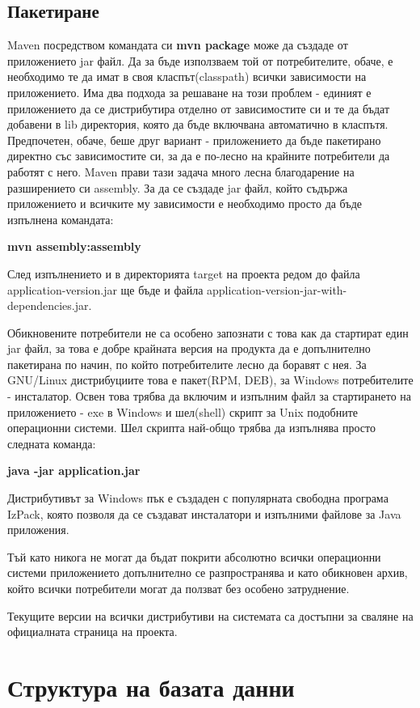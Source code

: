 \subsection{Пакетиране}

Maven посредством командата си \textbf{mvn package} може да създаде от
приложението jar файл. Да за бъде използваем той от потребителите,
обаче, е необходимо те да имат в своя класпът(classpath) всички зависимости на
приложението. Има два подхода за решаване на този проблем - единият е
приложението да се дистрибутира отделно от зависимостите си и те да
бъдат добавени в lib директория, която да бъде включвана автоматично в
класпътя. Предпочетен, обаче, беше друг вариант - приложението да бъде
пакетирано директно със зависимостите си, за да е по-лесно на крайните
потребители да работят с него. Maven прави тази задача много лесна
благодарение на разширението си assembly. За да се създаде jar файл,
който съдържа приложението и всичките му зависимости е необходимо
просто да бъде изпълнена командата:

\textbf{mvn assembly:assembly}

След изпълнението и в директорията target на проекта редом до файла
application-version.jar ще бъде и файла
application-version-jar-with-dependencies.jar.

Обикновените потребители не са особено запознати с това как да
стартират един jar файл, за това е добре крайната версия на продукта
да е допълнително пакетирана по начин, по който потребителите лесно да
боравят с нея. За GNU/Linux дистрибуциите това е пакет(RPM, DEB), за
Windows потребителите - инсталатор. Освен това трябва да включим и
изпълним файл за стартирането на приложението - exe в Windows и шел(shell)
скрипт за Unix подобните операционни системи. Шел скрипта най-общо
трябва да изпълнява просто следната команда:

\textbf{java -jar application.jar}

Дистрибутивът за Windows пък е създаден с популярната свободна
програма IzPack, която позволя да се създават инсталатори и изпълними
файлове за Java приложения. 

Тъй като никога не могат да бъдат покрити абсолютно всички операционни
системи приложението допълнително се разпространява и като обикновен
архив, който всички потребители могат да ползват без особено
затруднение. 

Текущите версии на всички дистрибутиви на системата са достъпни за
сваляне на официалната страница на проекта.
\section{Структура на базата данни}

